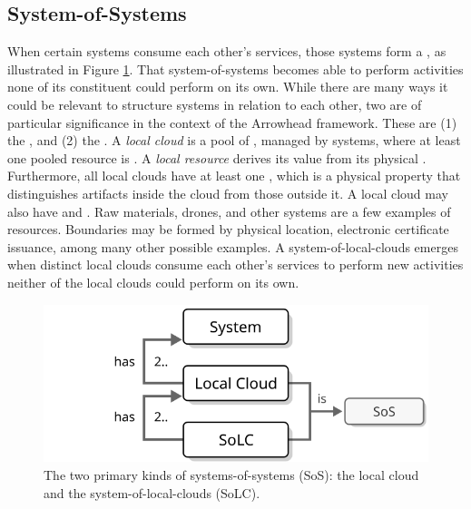 \subsection{System-of-Systems}

When certain systems consume each other's services, those systems form a , as illustrated in Figure \ref{fig:system-of-systems-small}.
That system-of-systems becomes able to perform activities none of its constituent  could perform on its own.
While there are many ways it could be relevant to structure systems in relation to each other, two are of particular significance in the context of the Arrowhead framework.
These are (1) the , and (2) the .
A \textit{local cloud} is a pool of , managed by systems, where at least one pooled resource is .
A \textit{local resource} derives its value from its physical .
Furthermore, all local clouds have at least one , which is a physical property that distinguishes artifacts inside the cloud from those outside it.
A local cloud may also have  and .
Raw materials, drones, and other systems are a few examples of resources.
Boundaries may be formed by physical location, electronic certificate issuance, among many other possible examples.
A system-of-local-clouds emerges when distinct local clouds consume each other's services to perform new activities neither of the local clouds could perform on its own.

\begin{figure}[ht!]
  \centering
  \includegraphics[scale=0.9]{figures/system-of-systems-small}
  \caption{
    The two primary kinds of systems-of-systems (SoS): the local cloud and the system-of-local-clouds (SoLC).
  }
  \label{fig:system-of-systems-small}
\end{figure}
